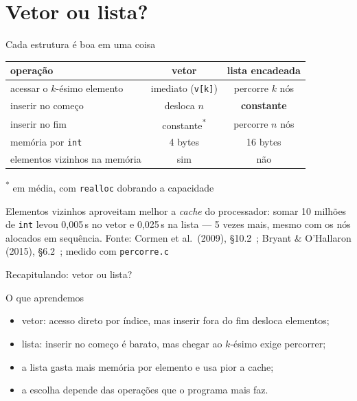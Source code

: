 \documentclass[aspectratio=169]{beamer}
\newcommand{\fonte}[1]{\vfill\hfill{\scriptsize\textcolor{UFSGray}{Fonte: #1}}}
\begin{document}
\section{Vetor ou lista?}

\begin{frame}{Cada estrutura é boa em uma coisa}
  \begin{center}
    \small
    \begin{tabular}{@{}lcc@{}}
      \toprule
      operação & vetor & lista encadeada\\
      \midrule
      acessar o $k$-ésimo elemento & imediato (\texttt{v[k]}) & percorre $k$ nós\\
      inserir no começo & desloca $n$ & \textbf{constante}\\
      inserir no fim & constante\textsuperscript{*} & percorre $n$ nós\\
      memória por \texttt{int} & 4 bytes & 16 bytes\\
      elementos vizinhos na memória & sim & não\\
      \bottomrule
    \end{tabular}

    \smallskip
    \scriptsize\textsuperscript{*} em média, com \texttt{realloc} dobrando a
    capacidade
  \end{center}
  \small
  Elementos vizinhos aproveitam melhor a \emph{cache} do processador: somar
  10 milhões de \texttt{int} levou 0,005\,s no vetor e 0,025\,s na lista ---
  5 vezes mais, mesmo com os nós alocados em sequência.
  \fonte{Cormen et al.\ (2009), §10.2~\cite{cormen2009introduction};
    Bryant \& O'Hallaron (2015), §6.2~\cite{bryant2015computer};
    medido com \texttt{percorre.c}}
\end{frame}

\begin{frame}{Recapitulando: vetor ou lista?}
  \begin{block}{O que aprendemos}
    \begin{itemize}
      \item vetor: acesso direto por índice, mas inserir fora do fim
        desloca elementos;
      \item lista: inserir no começo é barato, mas chegar ao $k$-ésimo
        exige percorrer;
      \item a lista gasta mais memória por elemento e usa pior a cache;
      \item a escolha depende das operações que o programa mais faz.
    \end{itemize}
  \end{block}
\end{frame}
\end{document}
